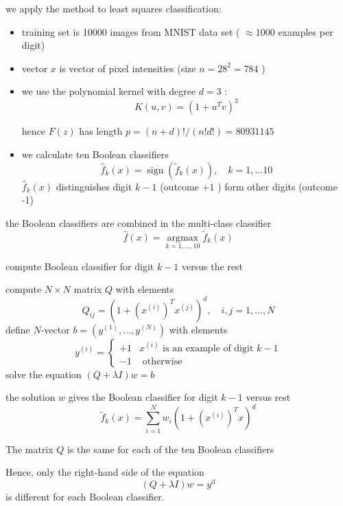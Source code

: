 we apply the method  to least squares classification:

\begin{itemize}
    \item training set is 10000 images from MNIST data set ( $ \approx 1000 $ examples per digit)
    \item vector $ x $ is vector of pixel intensities (size $ n=28^{2}=784 $ )
    \item we use the polynomial kernel with degree $ d=3 $ :
$$
K(u, v)=\left(1+u^{T} v\right)^{3}
$$

hence $ F(z) $ has length $ p=(n+d) ! /(n ! d !)=80931145 $

    \item we calculate ten Boolean classifiers
$$
\hat{f}_{k}(x)=\operatorname{sign}\left(\tilde{f}_{k}(x)\right), \quad k=1, \ldots 10
$$
$ \hat{f}_{k}(x) $ distinguishes digit $ k-1 $ (outcome $ +1 $ ) form other digits (outcome -1)


\end{itemize}


the Boolean classifiers are combined in the multi-class classifier
$$
\hat{f}(x)=\underset{k=1, \ldots, 10}{\operatorname{argmax}} \tilde{f}_{k}(x)
$$


\begin{algorithm}[htbp]
    \caption{compute Boolean classifier for digit $ k-1 $ versus the rest}
    compute $ N \times N $ matrix $ Q $ with elements
    $$
    Q_{i j}=\left(1+\left(x^{(i)}\right)^{T} x^{(j)}\right)^{d}, \quad i, j=1, \ldots, N
    $$\;
    define $ N $-vector $ b=\left(y^{(1)}, \ldots, y^{(N)}\right) $ with elements
    $$
    y^{(i)}=\left\{\begin{array}{ll}
    +1 & x^{(i)} \text { is an example of digit } k-1 \\
    -1 & \text { otherwise }
    \end{array}\right.
    $$\;
    solve the equation $ (Q+\lambda I) w=b $

\end{algorithm}

the solution $ w $ gives the Boolean classifier for digit $ k-1 $ versus rest
$$
\tilde{f}_{k}(x)=\sum_{i=1}^{N} w_{i}\left(1+\left(x^{(i)}\right)^{T} x\right)^{d}
$$



The matrix $ Q $ is the same for each of the ten Boolean classifiers

Hence, only the right-hand side of the equation
$$
(Q+\lambda I) w=y^{\mathrm{d}}
$$
is different for each Boolean classifier.


